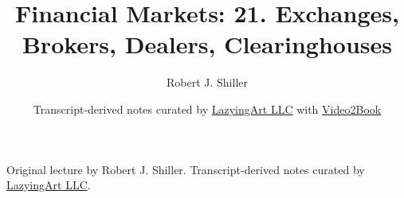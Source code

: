 \documentclass[11pt,oneside]{book}
\begin{document}
\frontmatter
\title{Financial Markets: 21. Exchanges, Brokers, Dealers, Clearinghouses}
\author{Robert J. Shiller}
\date{Transcript-derived notes curated by \href{https://lazying.art}{LazyingArt LLC} with \href{https://github.com/lachlanchen/Video2Book}{Video2Book}}
\maketitle
\begin{center}
\small Original lecture by Robert J. Shiller. Transcript-derived notes curated by \href{https://lazying.art}{LazyingArt LLC}.
\end{center}
\clearpage
\mainmatter

\end{document}

